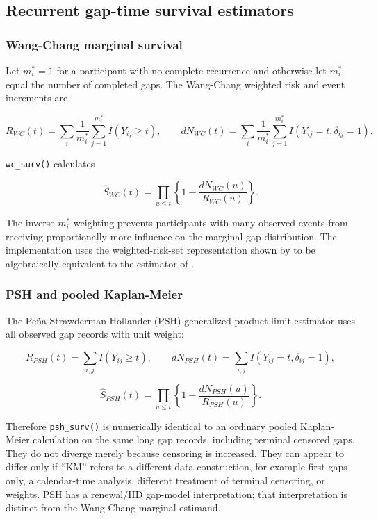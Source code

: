 \documentclass[
  12pt]{article}
\begin{document}
\subsection{Recurrent gap-time survival
estimators}\label{recurrent-gap-time-survival-estimators}

\subsubsection{Wang-Chang marginal
survival}\label{wang-chang-marginal-survival}

Let \(m_i^*=1\) for a participant with no complete recurrence and
otherwise let \(m_i^*\) equal the number of completed gaps. The
Wang-Chang weighted risk and event increments \citep{wang1999, luo2011}
are

\[
R_{WC}(t)=\sum_i\frac{1}{m_i^*}\sum_{j=1}^{m_i^*} I(Y_{ij}\geq t),
\qquad
dN_{WC}(t)=\sum_i\frac{1}{m_i^*}\sum_{j=1}^{m_i^*}
I(Y_{ij}=t,\delta_{ij}=1).
\]

\texttt{wc\_surv()} calculates

\[
\widehat S_{WC}(t)=\prod_{u\leq t}
\left\{1-\frac{dN_{WC}(u)}{R_{WC}(u)}\right\}.
\]

The inverse-\(m_i^*\) weighting prevents participants with many observed
events from receiving proportionally more influence on the marginal gap
distribution. The implementation uses the weighted-risk-set
representation shown by \citet{luo2011} to be algebraically equivalent
to the estimator of \citet{wang1999}.

\subsubsection{PSH and pooled
Kaplan-Meier}\label{psh-and-pooled-kaplan-meier}

The Peña-Strawderman-Hollander (PSH) generalized product-limit estimator
\citep{pena2001} uses all observed gap records with unit weight:

\[
R_{PSH}(t)=\sum_{i,j}I(Y_{ij}\geq t),\qquad
dN_{PSH}(t)=\sum_{i,j}I(Y_{ij}=t,\delta_{ij}=1),
\]

\[
\widehat S_{PSH}(t)=\prod_{u\leq t}
\left\{1-\frac{dN_{PSH}(u)}{R_{PSH}(u)}\right\}.
\]

Therefore \texttt{psh\_surv()} is numerically identical to an ordinary
pooled Kaplan-Meier calculation on the same long gap records, including
terminal censored gaps. They do not diverge merely because censoring is
increased. They can appear to differ only if ``KM'' refers to a
different data construction, for example first gaps only, a
calendar-time analysis, different treatment of terminal censoring, or
weights. PSH has a renewal/IID gap-model interpretation; that
interpretation is distinct from the Wang-Chang marginal estimand.
\end{document}
